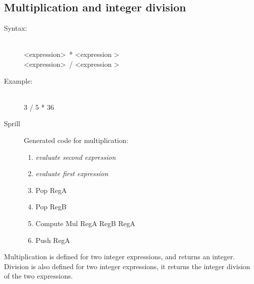 \documentclass[10pt,a4paper]{report}
\begin{document}
\subsection{Multiplication and integer division}
\begin{description}
	\item[Syntax:] \hfill \\ 
		\textless expression\textgreater ~* \textless expression \textgreater \\
		\textless expression\textgreater ~/ \textless expression \textgreater
	\item[Example:] \hfill \\
		3 / 5 * 36
	\item[Sprill] Generated code for multiplication:
		\begin{enumerate}
			\item \emph{evaluate second expression}
			\item \emph{evaluate first expression}
			\item Pop RegA
			\item Pop RegB
			\item Compute Mul RegA RegB RegA
			\item Push RegA
		\end{enumerate}
\end{description}
Multiplication is defined for two integer expressions, and returns an integer.
Division is also defined for two integer expressions, it returns the integer division of the two expressions. 
\end{document}
